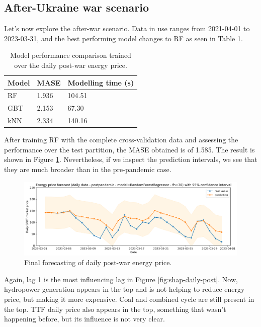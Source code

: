 \subsection{After-Ukraine war scenario}
Let's now explore the after-war scenario. Data in use ranges from 2021-04-01 to 2023-03-31, and the best performing model changes to RF as seen in Table \ref{tab:cv-daily-post}.

\begin{table}[H]
\centering
\begin{tabular}{@{}l|l|l@{}}
\toprule
Model & MASE  & Modelling time (s)  \\ \midrule
RF    & 1.936 & 104.51  \\
GBT   & 2.153 & 67.30   \\
kNN   & 2.334 & 140.16  \\ \bottomrule
\end{tabular}
\caption{Model performance comparison trained over the daily post-war energy price.}
\label{tab:cv-daily-post}
\end{table}

After training RF with the complete cross-validation data and assessing the performance over the test partition, the MASE obtained is of 1.585. The result is shown in Figure \ref{fig:forecast-daily-post}. Nevertheless, if we inspect the prediction intervals, we see that they are much broader than in the pre-pandemic case.

\begin{figure}[H]
\centering
    \caption{Final forecasting of daily post-war energy price.}
    \label{fig:forecast-daily-post}
    \includegraphics[scale=0.4]{images/analysis/forecast-daily-post}
\end{figure}

Again, lag 1 is the most influencing lag in Figure \ref{fig:shap-daily-post}. Now, hydropower generation appears in the top and is not helping to reduce energy price, but making it more expensive. Coal and combined cycle are still present in the top. TTF daily price also appears in the top, something that wasn't happening before, but its influence is not very clear.

